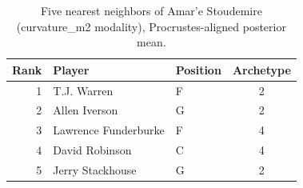 \begin{table}[htbp]
  \centering\small
  \begin{tabular}{rllc}
    \toprule
    Rank & Player & Position & Archetype \\
    \midrule
    1 & T.J. Warren & F & 2 \\
    2 & Allen Iverson & G & 2 \\
    3 & Lawrence Funderburke & F & 4 \\
    4 & David Robinson & C & 4 \\
    5 & Jerry Stackhouse & G & 2 \\
    \bottomrule
  \end{tabular}
  \caption{Five nearest neighbors of Amar'e Stoudemire (curvature_m2 modality), Procrustes-aligned posterior mean.}
  \label{tab:Amar_e_Stoudemire_neighbors_curvature_m2}
\end{table}

